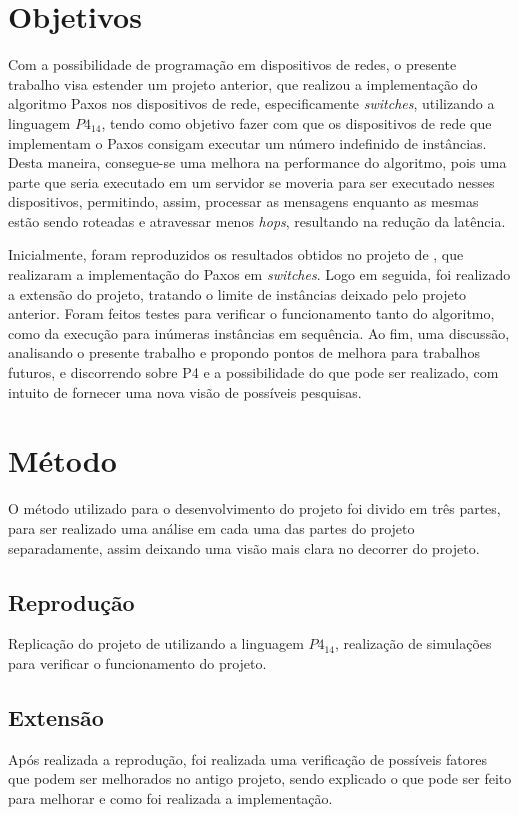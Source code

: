 \documentclass[
    12pt,
    openright, 
    oneside,
    a4paper,
    french,
    english,
    brazil
    ]{facom-ufu-abntex2}
\theoremstyle{definition}
\begin{document}
\section{Objetivos}
Com a possibilidade de programação em dispositivos de redes, o presente trabalho 
visa estender um projeto anterior, que realizou a implementação do algoritmo Paxos nos 
dispositivos de rede, especificamente \emph{switches}, utilizando a linguagem $P4_{14}$,
tendo como objetivo fazer com que os dispositivos de rede que implementam o Paxos
consigam executar um número indefinido de instâncias.
Desta maneira, consegue-se uma melhora na performance do algoritmo, pois uma parte 
que seria executado em um servidor se moveria para ser executado nesses dispositivos, permitindo,
assim, processar as mensagens enquanto as mesmas estão sendo roteadas e atravessar menos
\emph{hops}, resultando na redução da latência.

Inicialmente, foram reproduzidos os resultados obtidos no projeto de \cite{dang2016paxos}, 
que realizaram a implementação do Paxos em \emph{switches}. Logo em seguida, foi realizado a extensão
do projeto, tratando o limite de instâncias deixado pelo projeto anterior. Foram feitos testes
para verificar o funcionamento tanto do algoritmo, como da execução para inúmeras instâncias em sequência.
Ao fim, uma discussão, analisando o presente trabalho e propondo pontos de melhora para trabalhos futuros,
e discorrendo sobre P4 e a possibilidade do que pode ser realizado, com intuito de fornecer uma nova visão de
possíveis pesquisas.

\section{Método}
O método utilizado para o desenvolvimento do projeto foi divido em três partes, para
ser realizado uma análise em cada uma das partes do projeto separadamente, assim deixando uma
visão mais clara no decorrer do projeto.

\subsection{Reprodução}
Replicação do projeto de \cite{dang2016paxos} utilizando a linguagem 
$P4_{14}$, realização de simulações para verificar o funcionamento do projeto.

\subsection{Extensão}
Após realizada a reprodução, foi realizada uma verificação de possíveis fatores que podem ser 
melhorados no antigo projeto, sendo explicado o que pode ser feito para melhorar e como foi
realizada a implementação.
\end{document}
